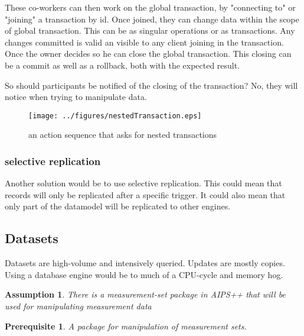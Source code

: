 \documentclass[]{lofar}
\newtheorem{assumption}{Assumption}[section]
\newtheorem{prerequisite}[enumi]{Prerequisite}
\begin{document}
        These co-workers can then work on the global transaction, by
        "connecting to" or "joining" a transaction by id. Once joined,
        they can change data within the scope of global
        transaction. This can be as singular operations or as
        transactions. Any changes committed is valid an visible to any
        client joining in the transaction. Once the owner decides so
        he can close the global transaction. This closing can be a
        commit as well as a rollback, both with the expected result.
     
        So should participants be notified of the closing of the
        transaction?  No, they will notice when trying to manipulate
        data.

        \begin{figure}
          \texttt{[image: ../figures/nestedTransaction.eps]}
          \hypertarget{fig:nestedTransaction}{}
          \caption{an action sequence that asks for nested transactions\label{fig:nestedTransactions}}
        \end{figure}

      \subsubsection{selective replication}
      \label{subsubsec:selective-replication}\hypertarget{subsubsec:selective-replication}{}%

        Another solution would be to use selective replication. This
        could mean that records will only be replicated after a
        specific trigger. It could also mean that only part of the
        datamodel will be replicated to other engines.

    \subsection{Datasets}
    \label{subsec:Datasets}\hypertarget{subsec:Datasets}{}%

      Datasets are high-volume and intensively queried. Updates are
      mostly copies. Using a database engine would be to much of a
      CPU-cycle and memory hog.

      \begin{assumption}
        There is a measurement-set package in AIPS++ that will be used
        for manipulating measurement data
        \label{ass:aips++}
      \end{assumption}

      \begin{prerequisite}
        A package for manipulation of measurement sets.
        \label{pre:aips++}
      \end{prerequisite}
\end{document}
